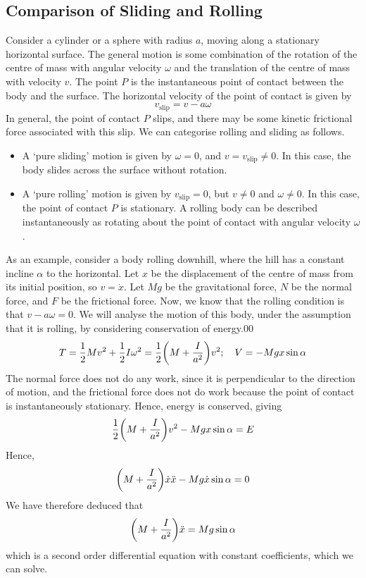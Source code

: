 \subsection{Comparison of Sliding and Rolling}
Consider a cylinder or a sphere with radius \(a\), moving along a stationary horizontal surface.
The general motion is some combination of the rotation of the centre of mass with angular velocity \(\omega\) and the translation of the centre of mass with velocity \(v\).
The point \(P\) is the instantaneous point of contact between the body and the surface.
The horizontal velocity of the point of contact is given by
\[
	v_\text{slip} = v - a\omega
\]
In general, the point of contact \(P\) slips, and there may be some kinetic frictional force associated with this slip.
We can categorise rolling and sliding as follows.
\begin{itemize}
	\item A `pure sliding' motion is given by \(\omega = 0\), and \(v = v_\text{slip} \neq 0\).
	      In this case, the body slides across the surface without rotation.
	\item A `pure rolling' motion is given by \(v_\text{slip} = 0\), but \(v \neq 0\) and \(\omega \neq 0\).
	      In this case, the point of contact \(P\) is stationary.
	      A rolling body can be described instantaneously as rotating about the point of contact with angular velocity \(\omega\).
\end{itemize}
As an example, consider a body rolling downhill, where the hill has a constant incline \(\alpha\) to the horizontal.
Let \(x\) be the displacement of the centre of mass from its initial position, so \(v = \dot x\).
Let \(Mg\) be the gravitational force, \(N\) be the normal force, and \(F\) be the frictional force.
Now, we know that the rolling condition is that \(v - a\omega = 0\).
We will analyse the motion of this body, under the assumption that it is rolling, by considering conservation of energy.00
\[
	T = \frac{1}{2}Mv^2 + \frac{1}{2}I\omega^2 = \frac{1}{2}\qty(M + \frac{I}{a^2})v^2;\quad V = -Mgx\sin\alpha
\]
The normal force does not do any work, since it is perpendicular to the direction of motion, and the frictional force does not do work because the point of contact is instantaneously stationary.
Hence, energy is conserved, giving
\[
	\frac{1}{2}\qty(M + \frac{I}{a^2})v^2 - Mgx\sin\alpha = E
\]
Hence,
\[
	\qty(M + \frac{I}{a^2})\dot x \ddot x - Mg \dot x \sin\alpha = 0
\]
We have therefore deduced that
\[
	\qty(M + \frac{I}{a^2})\ddot x = Mg\sin\alpha
\]
which is a second order differential equation with constant coefficients, which we can solve.
